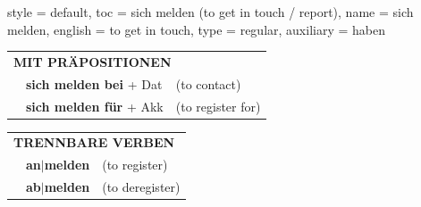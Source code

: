 \begin{verbentry}{
  style = {default},
  toc = {sich melden (to get in touch / report)},
  name = {sich melden},
  english = {to get in touch},
  type = {regular},
  auxiliary = {haben}
}
\vspace{10pt}

\begin{tabular}{lll}
\multicolumn{3}{l}{\textbf{MIT PRÄPOSITIONEN}}\\
& \textbf{sich melden bei} + Dat & (to contact)\\
& \textbf{sich melden für} + Akk & (to register for)\\
\end{tabular}
\hfill
\begin{tabular}{lll}
\multicolumn{3}{l}{\textbf{TRENNBARE VERBEN}}\\
& \textbf{an$|$melden} & (to register)\\
& \textbf{ab$|$melden} & (to deregister)\\
\end{tabular}
\vspace{-5pt}
\end{verbentry}

